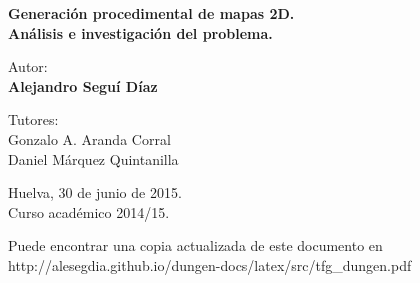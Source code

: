 {\begin{center}
{\LARGE \bf Generación procedimental de mapas 2D. \\ Análisis e investigación del problema. }

\end{center} 




\vfill

\begin{center}
{\normalsize Autor: \\ {\bf Alejandro Seguí Díaz}}
\end{center}

\begin{center}
{\small Tutores: }
\vspace*{0.2cm}
{\small \\  Gonzalo A. Aranda Corral \\ Daniel Márquez Quintanilla}
\end{center}
\begin{center}
{\footnotesize Huelva, 30 de junio de 2015.\\Curso académico 2014/15.}
\end{center}

\newpage
\thispagestyle{empty}
\vspace*{3.5cm}
\begin{center}
\small Puede encontrar una copia actualizada de este documento en \\
\small http://alesegdia.github.io/dungen-docs/latex/src/tfg\_dungen.pdf
\end{center}
\vfill


\newpage
\thispagestyle{empty}
\vfill



}

